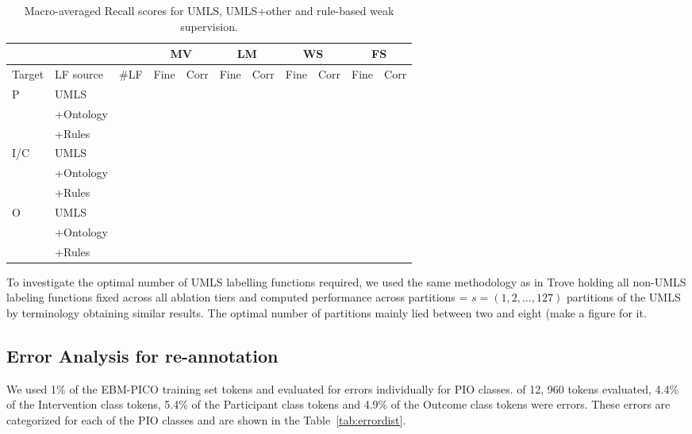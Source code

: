 \documentclass[10.7pt,]{article}
\begin{document}
\begin{table}[!ht]
    \centering
    \begin{tabular}{|l|l|l|l|l|l|l|l|l|l|l|}
        \hline
        \multicolumn{3}{|c|}{} &
        \multicolumn{2}{|c|}{MV} & \multicolumn{2}{|c|}{LM} & \multicolumn{2}{|c|}{WS} & \multicolumn{2}{|c|}{FS} \\
        \hline
        Target & LF source & \#LF & Fine & Corr & Fine & Corr & Fine & Corr & Fine & Corr \\ \hline
        P & UMLS & ~ & ~ & ~ & ~ & ~ & ~ & ~ & ~ & ~  \\ \hline
        ~ & +Ontology & ~ & ~ & ~ & ~ & ~ & ~ & ~ & ~ & ~  \\ \hline
        ~ & +Rules & ~ & ~ & ~ & ~ & ~ & ~ & ~ & ~ & ~  \\ \hline
        I/C & UMLS & ~ & ~ & ~ & ~ & ~ & ~ & ~ & ~ & ~  \\ \hline
        ~ & +Ontology & ~ & ~ & ~ & ~ & ~ & ~ & ~ & ~ & ~   \\ \hline
        ~ & +Rules & ~ & ~ & ~ & ~ & ~ & ~ & ~ & ~ & ~   \\ \hline
        O & UMLS & ~ & ~ & ~ & ~ & ~ & ~ & ~ & ~ & ~   \\ \hline
        ~ & +Ontology & ~ & ~ & ~ & ~ & ~ & ~ & ~ & ~ & ~   \\ \hline
        ~ & +Rules & ~ & ~ & ~ & ~ & ~ & ~ & ~ & ~ & ~   \\\hline
    \end{tabular}
    \caption{\label{tab:recall_res} Macro-averaged Recall scores for UMLS, UMLS+other and rule-based weak supervision.}
\end{table}


To investigate the optimal number of UMLS labelling functions required, we used the same methodology as in Trove holding all non-UMLS labeling functions fixed across all ablation tiers and computed performance across partitions = $s = ( 1, 2, \dotso , 127 )$ partitions of the UMLS by terminology obtaining similar results.
The optimal number of partitions mainly lied between two and eight (make a figure for it.


%
%
%
\subsection{Error Analysis for re-annotation}\label{subsec:err}
%
We used 1\% of the EBM-PICO training set tokens and evaluated for errors individually for PIO classes.
of 12, 960 tokens evaluated, 4.4\% of the Intervention class tokens, 5.4\% of the Participant class tokens and 4.9\% of the Outcome class tokens were errors.
These errors are categorized for each of the PIO classes and are shown in the Table~\ref{tab:errordist}.
%
\end{document}
